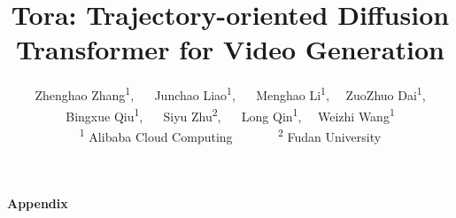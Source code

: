 \documentclass[10pt,twocolumn,letterpaper]{article}
\title{Tora: Trajectory-oriented Diffusion Transformer for Video Generation}
\author{
    Zhenghao Zhang\textsuperscript{\rm 1}\footnotemark[1], ~~ Junchao Liao\textsuperscript{\rm 1}\footnotemark[1], ~~ Menghao Li\textsuperscript{\rm 1}, ~~ZuoZhuo Dai\textsuperscript{\rm 1},\\
    Bingxue Qiu\textsuperscript{\rm 1}, ~~ Siyu Zhu\textsuperscript{\rm 2}, ~~ Long Qin\textsuperscript{\rm 1}, ~~Weizhi Wang\textsuperscript{\rm 1}\\
    \textsuperscript{\rm 1} Alibaba Cloud Computing ~~~~~~ \textsuperscript{\rm 2} Fudan University \\
}
\begin{document}
\maketitle
\renewcommand{\thefootnote}{\fnsymbol{footnote}}
\renewcommand{\thefootnote}{\arabic{footnote}}

    





\cleardoublepage
\vspace{6mm}
\begin{center}
   {\huge \textbf{Appendix}}
\end{center}


{
    \small
    
    
}

% 
\end{document}
